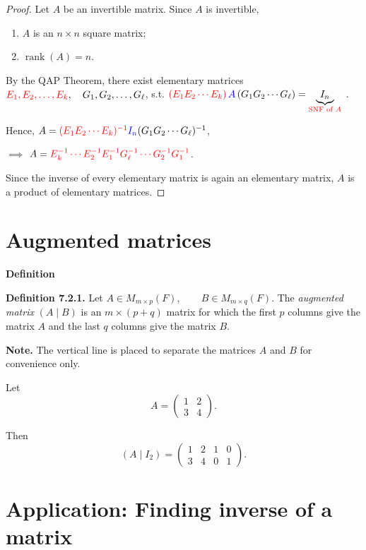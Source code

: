 \documentclass[12pt]{article}
\begin{document}
\begin{proof}
Let $A$ be an invertible matrix. Since $A$ is invertible,
\begin{enumerate}
    \item $A$ is an $n\times n$ square matrix;
    \item $\operatorname{rank}(A)=n$.
\end{enumerate}

By the QAP Theorem, there exist elementary matrices $\textcolor{red}{E_1,E_2,\ldots,E_k},\quad G_1,G_2,\ldots,G_\ell$,
s.t. $\textcolor{red}{(E_1E_2\cdots E_k)}\,\textcolor{blue}{A}\,(G_1G_2\cdots G_\ell)= \underbrace{I_n}_{\textcolor{red}{\text{SNF of $A$}}}$ .

Hence, $A=\textcolor{red}{(E_1E_2\cdots E_k)^{-1}}\textcolor{blue}{I_n}(G_1G_2\cdots G_\ell)^{-1}$,

$\implies$ $A=\textcolor{red}{E_k^{-1}\cdots E_2^{-1}E_1^{-1}G_\ell^{-1}\cdots G_2^{-1}G_1^{-1}}$.

Since the inverse of every elementary matrix is again an elementary matrix, $A$ is a product of elementary matrices.
\end{proof}

\section{Augmented matrices}

\textbf{Definition}

\textbf{Definition 7.2.1.}
Let $A\in M_{m\times p}(F), \qquad B\in M_{m\times q}(F)$. The \emph{augmented matrix} $(A\mid B)$ is an
$m\times (p+q)$ matrix for which the first $p$ columns give the matrix $A$ and the last $q$ columns give the matrix $B$.

\textbf{Note. }
The vertical line is placed to separate the matrices $A$ and $B$ for convenience only.

Let
\[
A=
\begin{pmatrix}
1 & 2\\
3 & 4
\end{pmatrix}.
\]

Then
\[
(A\mid I_2)=
\left(
\begin{array}{cc|cc}
1 & 2 & 1 & 0\\
3 & 4 & 0 & 1
\end{array}
\right).
\]

\newpage

\section{Application: Finding inverse of a matrix}
\end{document}
